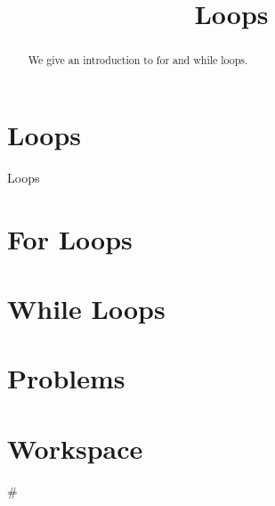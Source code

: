 \documentclass{ximera}
\title{Loops}
\begin{document}
  
\begin{abstract}  
We give an introduction to for and while loops.
\end{abstract}  
\maketitle

\section{Loops}

Loops

\section{For Loops}

\section{While Loops}

\section{Problems}

\begin{question}
\end{question}

\begin{question}
\end{question}

\section{Workspace}

\begin{sageCell}
#
\end{sageCell}
\end{document}
